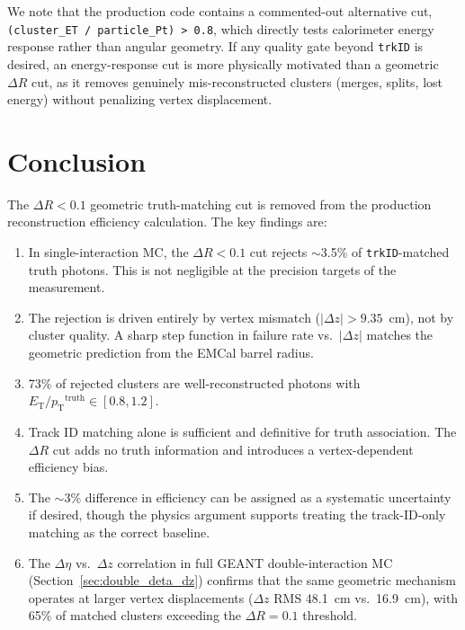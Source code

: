 \documentclass[11pt,letterpaper]{article}
\newcommand{\DR}{\ensuremath{\Delta R}}
\newcommand{\pT}{\ensuremath{p_{\text{T}}}}
\newcommand{\ET}{\ensuremath{E_{\text{T}}}}
\begin{document}
We note that the production code contains a commented-out alternative cut,
\texttt{(cluster\_ET / particle\_Pt) > 0.8}, which directly tests
calorimeter energy response rather than angular geometry. If any quality gate
beyond \texttt{trkID} is desired, an energy-response cut is more physically
motivated than a geometric $\DR$ cut, as it removes genuinely
mis-reconstructed clusters (merges, splits, lost energy) without penalizing
vertex displacement.

\section{Conclusion}
\label{sec:conclusion}

The $\DR < 0.1$ geometric truth-matching cut is removed from the production
reconstruction efficiency calculation. The key findings are:

\begin{enumerate}
  \item In single-interaction MC, the $\DR < 0.1$ cut rejects $\sim$3.5\% of
    \texttt{trkID}-matched truth photons. This is not negligible at the
    precision targets of the measurement.

  \item The rejection is driven entirely by vertex mismatch
    ($|\Delta z| > 9.35$~cm), not by cluster quality. A sharp step function
    in failure rate vs.\ $|\Delta z|$ matches the geometric prediction from
    the EMCal barrel radius.

  \item 73\% of rejected clusters are well-reconstructed photons with
    $\ET / \pT^{\text{truth}} \in [0.8, 1.2]$.

  \item Track ID matching alone is sufficient and definitive for truth
    association. The $\DR$ cut adds no truth information and introduces a
    vertex-dependent efficiency bias.

  \item The $\sim$3\% difference in efficiency can be assigned as a systematic
    uncertainty if desired, though the physics argument supports treating the
    track-ID-only matching as the correct baseline.

  \item The $\Delta\eta$ vs.\ $\Delta z$ correlation in full GEANT
    double-interaction MC (Section~\ref{sec:double_deta_dz}) confirms
    that the same geometric mechanism operates at larger vertex
    displacements ($\Delta z$ RMS 48.1~cm vs.\ 16.9~cm), with 65\% of
    matched clusters exceeding the $\DR = 0.1$ threshold.
\end{enumerate}
\end{document}
